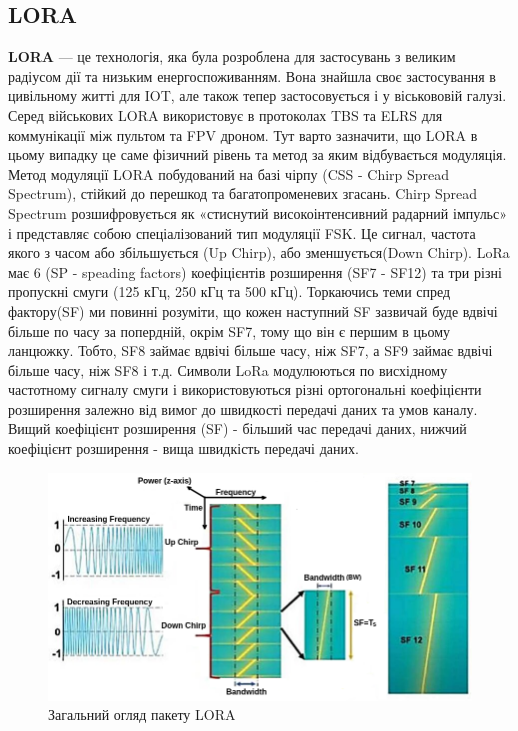\documentclass{article}
\begin{document}
\subsection{LORA}
\textbf{LORA} --- це технологія, яка була розроблена для застосувань з великим радіусом дії та низьким енергоспоживанням. Вона знайшла своє застосування в цивільному житті для IOT, але також тепер застосовується і у віськововій галузі. Серед військових LORA використовує в протоколах TBS та ELRS для коммунікації між пультом та FPV дроном. Тут варто зазначити, що LORA в цьому випадку це саме фізичний рівень та метод за яким відбувається модуляція. Метод модуляції LORA побудований на базі чірпу (CSS -  Chirp Spread Spectrum), стійкий до перешкод та багатопроменевих згасань. Chirp Spread Spectrum розшифровується як «стиснутий високоінтенсивний радарний імпульс» і представляє собою спеціалізований тип модуляції FSK. Це сигнал, частота якого з часом або збільшується (Up Chirp), або зменшується(Down Chirp). LoRa має 6 (SP - speading factors) коефіцієнтів розширення (SF7 - SF12) та три різні пропускні смуги (125 кГц, 250 кГц та 500 кГц). Торкаючись теми спред фактору(SF) ми повинні розуміти, що кожен наступний SF зазвичай буде вдвічі більше по часу за попердній, окрім SF7, тому що він є першим в цьому ланцюжку. Тобто, SF8 займає вдвічі більше часу, ніж SF7, а SF9 займає вдвічі більше часу, ніж SF8 і т.д. Символи LoRa модулюються по висхідному частотному сигналу смуги і використовуються різні ортогональні коефіцієнти розширення залежно від вимог до швидкості передачі даних та умов каналу. Вищий коефіцієнт розширення (SF) - більший час передачі даних, нижчий коефіцієнт розширення - вища швидкість передачі даних.

\begin{figure}[h!]
	\centering
	\includegraphics[width=0.9\linewidth]{images/lora_chirp_main.png}
	\caption{\label{fig:lora_chirp_main} Загальний огляд пакету LORA}
\end{figure}
\end{document}
